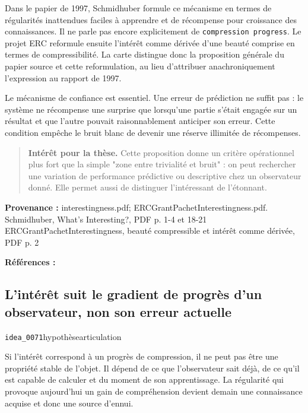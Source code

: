 \documentclass[10pt,a4paper]{article}
\begin{document}
Dans le papier de 1997, Schmidhuber formule ce mécanisme en termes de régularités inattendues faciles à apprendre et de récompense pour croissance des connaissances. Il ne parle pas encore explicitement de \texttt{compression progress}. Le projet ERC reformule ensuite l'intérêt comme dérivée d'une beauté comprise en termes de compressibilité. La carte distingue donc la proposition générale du papier source et cette reformulation, au lieu d'attribuer anachroniquement l'expression au rapport de 1997.

Le mécanisme de confiance est essentiel. Une erreur de prédiction ne suffit pas : le système ne récompense une surprise que lorsqu'une partie s'était engagée sur un résultat et que l'autre pouvait raisonnablement anticiper son erreur. Cette condition empêche le bruit blanc de devenir une réserve illimitée de récompenses.

\begin{quote}
\textbf{Intérêt pour la thèse.} Cette proposition donne un critère opérationnel plus fort que la simple "zone entre trivialité et bruit" : on peut rechercher une variation de performance prédictive ou descriptive chez un observateur donné. Elle permet aussi de distinguer l'intéressant de l'étonnant.
\end{quote}
{\footnotesize\color{metadata}\textbf{Provenance :} interestingness.pdf; ERCGrantPachetInterestingness.pdf. Schmidhuber, What's Interesting?, PDF p. 1-4 et 18-21 ERCGrantPachetInterestingness, beauté compressible et intérêt comme dérivée, PDF p. 2\par}
{\footnotesize\color{metadata}\textbf{Références :} \parencite{schmidhuber1997interesting}\par}

\subsection{L'intérêt suit le gradient de progrès d'un observateur, non son erreur actuelle}
{\small\color{metadata} \texttt{idea\_0071}\quad\textbullet\quad hypothèse\quad\textbullet\quad articulation\par}

Si l'intérêt correspond à un progrès de compression, il ne peut pas être une propriété stable de l'objet. Il dépend de ce que l'observateur sait déjà, de ce qu'il est capable de calculer et du moment de son apprentissage. La régularité qui provoque aujourd'hui un gain de compréhension devient demain une connaissance acquise et donc une source d'ennui.
\end{document}
